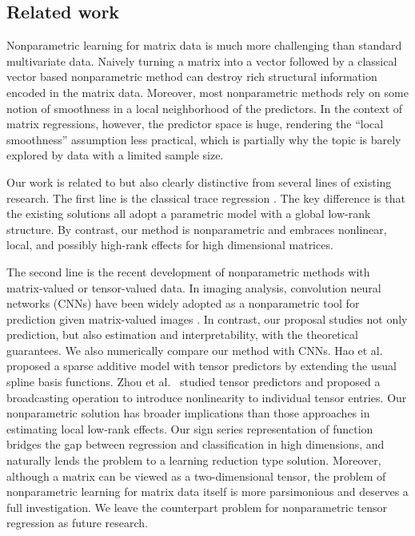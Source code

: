 \documentclass[aos]{imsart}
\theoremstyle{definition}
\begin{document}
\subsection{Related work}

Nonparametric learning for matrix data is much more challenging than standard multivariate data. Naively turning a matrix into a vector followed by a classical vector based nonparametric method can destroy rich structural information encoded in the matrix data. Moreover, most nonparametric methods rely on some notion of smoothness in a local neighborhood of the predictors. In the context of matrix regressions, however, the predictor space is huge, rendering the ``local smoothness'' assumption less practical, which is partially why the topic is barely explored by data with a limited sample size.  

Our work is related to but also clearly distinctive from several lines of existing research. The first line is the classical trace regression \citep{fan2019generalized,hamidi2019low}. The key difference is that the existing solutions all adopt a parametric model with a global low-rank structure. By contrast, our method is nonparametric and embraces nonlinear, local, and possibly high-rank effects for high dimensional matrices. 
 
The second line is the recent development of nonparametric methods with matrix-valued or tensor-valued data. In imaging analysis,  convolution neural networks (CNNs) have been widely adopted as a nonparametric tool for prediction given matrix-valued images \citep{goodfellow2016deep}. In contrast, our proposal studies not only prediction, but also estimation and interpretability, with the theoretical guarantees. We also numerically compare our method with CNNs. Hao et al.~\citep{hao2019sparse} proposed a sparse additive model with tensor predictors by extending the usual spline basis functions. Zhou et al.~\citep{zhou2020broadcasted} studied tensor predictors and proposed a broadcasting operation to introduce nonlinearity to individual tensor entries. Our nonparametric solution has broader implications than those approaches in estimating local low-rank effects. Our sign series representation of function bridges the gap between regression and classification in high dimensions, and naturally lends the problem to a learning reduction type solution. Moreover, although a matrix can be viewed as a two-dimensional tensor, the problem of nonparametric learning for matrix data itself is more parsimonious and deserves a full investigation. We leave the counterpart problem for nonparametric tensor regression as future research. 
\end{document}
